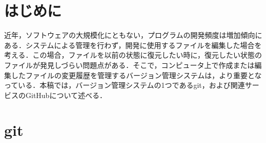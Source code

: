 \documentclass[a4j,9pt,twocolumn]{jsarticle}
\begin{document}


\section{はじめに}
近年，ソフトウェアの大規模化にともない，プログラムの開発頻度は増加傾向にある．システムによる管理を行わず，開発に使用するファイルを編集した場合を考える．この場合，ファイルを以前の状態に復元したい時に，復元したい状態のファイルが発見しづらい問題点がある．そこで，コンピュータ上で作成または編集したファイルの変更履歴を管理するバージョン管理システムは，より重要となっている．本稿では，バージョン管理システムの1つであるgit，および関連サービスのGitHubについて述べる．

\section{git}
\end{document}
